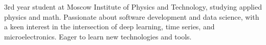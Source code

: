 
\begin{cvparagraph}

    3rd year student at Moscow Institute of Physics and Technology, studying applied physics and math. Passionate about software development and data science, with a keen interest in the intersection of deep learning, time series, and microelectronics. Eager to learn new technologies and tools.

\end{cvparagraph}
